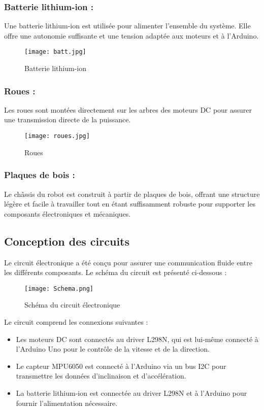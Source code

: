 \documentclass{report}
\begin{document}
\vspace{10cm}
\subsubsection{Batterie lithium-ion :} Une batterie lithium-ion est utilisée pour alimenter l'ensemble du système. Elle offre une autonomie suffisante et une tension adaptée aux moteurs et à l'Arduino.
\begin{figure}[h]
    \centering
    \texttt{[image: batt.jpg]} %
    \caption{Batterie lithium-ion}
    \label{fig:Batterie lithium-ion}
\end{figure}
\subsubsection{Roues :}  Les roues sont montées directement sur les arbres des moteurs DC pour assurer une transmission directe de la puissance.
\begin{figure}[h]
    \centering
    \texttt{[image: roues.jpg]} %
    \caption{Roues}
    \label{fig:Roues}
\end{figure}
\subsubsection{Plaques de bois :}  Le châssis du robot est construit à partir de plaques de bois, offrant une structure légère et facile à travailler tout en étant suffisamment robuste pour supporter les composants électroniques et mécaniques.


\subsection{Conception des circuits}
Le circuit électronique a été conçu pour assurer une communication fluide entre les différents composants. Le schéma du circuit est présenté ci-dessous :

\begin{figure}[h!]
    \centering
    \texttt{[image: Schema.png]} %
    \caption{Schéma du circuit électronique}
    \label{fig:electronic_circuit}
\end{figure}

Le circuit comprend les connexions suivantes :
\begin{itemize}
    \item Les moteurs DC sont connectés au driver L298N, qui est lui-même connecté à l'Arduino Uno pour le contrôle de la vitesse et de la direction.
    \item Le capteur MPU6050 est connecté à l'Arduino via un bus I2C pour transmettre les données d'inclinaison et d'accélération.
    \item La batterie lithium-ion est connectée au driver L298N et à l'Arduino pour fournir l'alimentation nécessaire.
\end{itemize}
\end{document}
